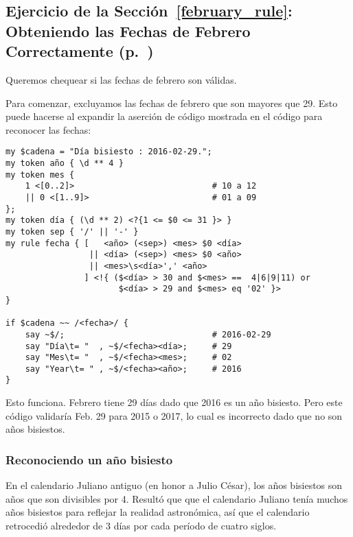 \subsection{Ejercicio de la Sección~\ref{february_rule}: Obteniendo las Fechas de Febrero Correctamente (p.~\pageref{february_rule})}
\label{sol_february_rule}

Queremos chequear si las fechas de febrero son válidas.

Para comenzar, excluyamos las fechas de febrero que son 
mayores que 29. Esto puede hacerse al expandir la aserción
de código mostrada en el código para reconocer las fechas:

\begin{verbatim}
my $cadena = "Día bisiesto : 2016-02-29.";                                         
my token año { \d ** 4 }                                        
my token mes {   
    1 <[0..2]>                            # 10 a 12                     
    || 0 <[1..9]>                         # 01 a 09                     
};
my token día { (\d ** 2) <?{1 <= $0 <= 31 }> }  
my token sep { '/' || '-' }                                                 
my rule fecha { [   <año> (<sep>) <mes> $0 <día> 
                 || <día> (<sep>) <mes> $0 <año> 
                 || <mes>\s<día>',' <año>
                ] <!{ ($<día> > 30 and $<mes> ==  4|6|9|11) or 
                       $<día> > 29 and $<mes> eq '02' }>
}                         

if $cadena ~~ /<fecha>/ {
    say ~$/;                              # 2016-02-29
    say "Día\t= "  , ~$/<fecha><día>;     # 29
    say "Mes\t= "  , ~$/<fecha><mes>;     # 02
    say "Year\t= " , ~$/<fecha><año>;     # 2016
}                    
\end{verbatim}

Esto funciona. Febrero tiene 29 días dado que 2016 es un
año bisiesto. Pero este código validaría Feb. 29 para 2015 o
2017, lo cual es incorrecto dado que no son años bisiestos.

\subsubsection{Reconociendo un año bisiesto}

En el calendario Juliano antiguo (en honor a Julio César),
los años bisiestos son años que son divisibles por 4. Resultó que 
que el calendario Juliano tenía muchos años bisiestos para reflejar 
la realidad astronómica, así que el calendario retrocedió
alrededor de 3 días por cada período de cuatro siglos.

